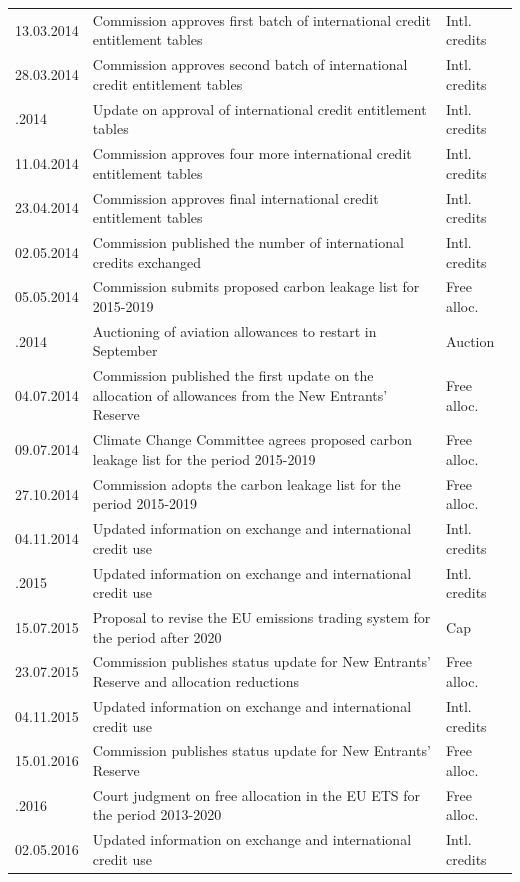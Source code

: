 \documentclass[
]{article}
\begin{document}
\begin{longtable}[l]{l>{\raggedright\arraybackslash}p{35em}l}
13.03.2014 & Commission approves first batch of international credit entitlement tables & Intl. credits\\
28.03.2014 & Commission approves second batch of international credit entitlement tables & Intl. credits\\
\addlinespace
04.04.2014 & Update on approval of international credit entitlement tables & Intl. credits\\
11.04.2014 & Commission approves four more international credit entitlement tables & Intl. credits\\
23.04.2014 & Commission approves final international credit entitlement tables & Intl. credits\\
02.05.2014 & Commission published the number of international credits exchanged & Intl. credits\\
05.05.2014 & Commission submits proposed carbon leakage list for 2015-2019 & Free alloc.\\
\addlinespace
04.06.2014 & Auctioning of aviation allowances to restart in September & Auction\\
04.07.2014 & Commission published the first update on the allocation of allowances from the New Entrants’ Reserve & Free alloc.\\
09.07.2014 & Climate Change Committee agrees proposed carbon leakage list for the period 2015-2019 & Free alloc.\\
27.10.2014 & Commission adopts the carbon leakage list for the period 2015-2019 & Free alloc.\\
04.11.2014 & Updated information on exchange and international credit use & Intl. credits\\
\addlinespace
04.05.2015 & Updated information on exchange and international credit use & Intl. credits\\
15.07.2015 & Proposal to revise the EU emissions trading system for the period after 2020 & Cap\\
23.07.2015 & Commission publishes status update for New Entrants’ Reserve and allocation reductions & Free alloc.\\
04.11.2015 & Updated information on exchange and international credit use & Intl. credits\\
15.01.2016 & Commission publishes status update for New Entrants’ Reserve & Free alloc.\\
\addlinespace
28.04.2016 & Court judgment on free allocation in the EU ETS for the period 2013-2020 & Free alloc.\\
02.05.2016 & Updated information on exchange and international credit use & Intl. credits\\

\end{longtable}
\end{document}
